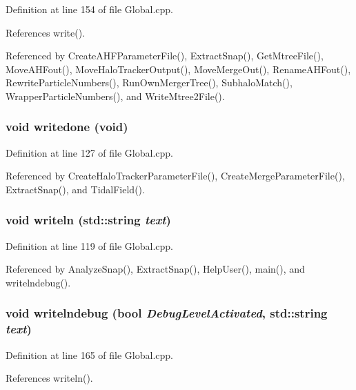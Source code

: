 Definition at line 154 of file Global.cpp.



References write().



Referenced by CreateAHFParameterFile(), ExtractSnap(), GetMtreeFile(), MoveAHFout(), MoveHaloTrackerOutput(), MoveMergeOut(), RenameAHFout(), RewriteParticleNumbers(), RunOwnMergerTree(), SubhaloMatch(), WrapperParticleNumbers(), and WriteMtree2File().

\subsubsection[{writedone}]{\setlength{\rightskip}{0pt plus 5cm}void writedone (void)}\label{Global_8h_a90a26977d0e79592478299043e94091e}


Definition at line 127 of file Global.cpp.



Referenced by CreateHaloTrackerParameterFile(), CreateMergeParameterFile(), ExtractSnap(), and TidalField().

\subsubsection[{writeln}]{\setlength{\rightskip}{0pt plus 5cm}void writeln (std::string {\em text})}\label{Global_8h_a37de7b6ae4852c4084f30507d58eb906}


Definition at line 119 of file Global.cpp.



Referenced by AnalyzeSnap(), ExtractSnap(), HelpUser(), main(), and writelndebug().

\subsubsection[{writelndebug}]{\setlength{\rightskip}{0pt plus 5cm}void writelndebug (bool {\em DebugLevelActivated}, \/  std::string {\em text})}\label{Global_8h_a5b25522225f9cc3d16b32059a125a93e}


Definition at line 165 of file Global.cpp.



References writeln().



